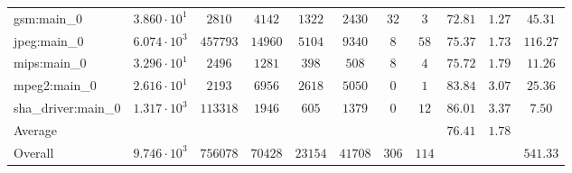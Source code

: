\begin{tabular}{|l|c|c|c|c|c|c|c|c|c|c|}
gsm:main\_0             & $ 3.860 \cdot 10^{1} $ & $ 2810   $ & $ 4142  $ & $ 1322  $ & $ 2430  $ & $ 32  $ & $ 3   $ & $ 72.81       $ & $ 1.27    $ & $ 45.31   $ \\
jpeg:main\_0            & $ 6.074 \cdot 10^{3} $ & $ 457793 $ & $ 14960 $ & $ 5104  $ & $ 9340  $ & $ 8   $ & $ 58  $ & $ 75.37       $ & $ 1.73    $ & $ 116.27  $ \\
mips:main\_0            & $ 3.296 \cdot 10^{1} $ & $ 2496   $ & $ 1281  $ & $ 398   $ & $ 508   $ & $ 8   $ & $ 4   $ & $ 75.72       $ & $ 1.79    $ & $ 11.26   $ \\
mpeg2:main\_0           & $ 2.616 \cdot 10^{1} $ & $ 2193   $ & $ 6956  $ & $ 2618  $ & $ 5050  $ & $ 0   $ & $ 1   $ & $ 83.84       $ & $ 3.07    $ & $ 25.36   $ \\
sha\_driver:main\_0     & $ 1.317 \cdot 10^{3} $ & $ 113318 $ & $ 1946  $ & $ 605   $ & $ 1379  $ & $ 0   $ & $ 12  $ & $ 86.01       $ & $ 3.37    $ & $ 7.50    $ \\
\hline
Average                 & $                    $ & $        $ & $       $ & $       $ & $       $ & $     $ & $     $ & $ 76.41       $ & $ 1.78    $ & $         $ \\
\hline
Overall                 & $ 9.746 \cdot 10^{3} $ & $ 756078 $ & $ 70428 $ & $ 23154 $ & $ 41708 $ & $ 306 $ & $ 114 $ & $             $ & $         $ & $ 541.33  $ \\
\hline
\end{tabular}
